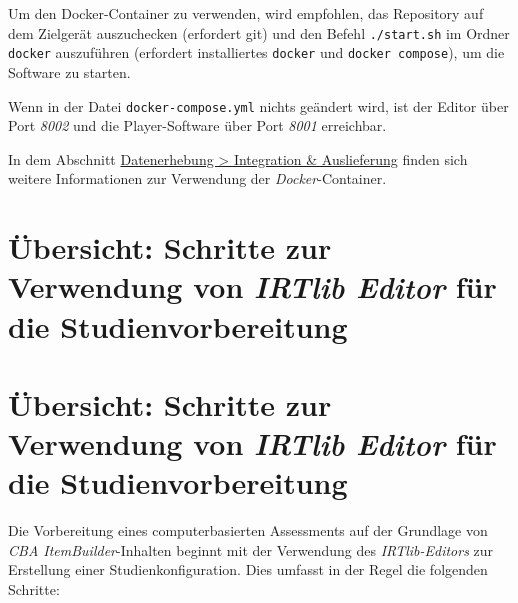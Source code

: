 \documentclass[
  letterpaper,
  DIV=11]{scrreprt}
\begin{document}
Um den Docker-Container zu verwenden, wird empfohlen, das Repository auf
dem Zielgerät auszuchecken (erfordert git) und den Befehl
\texttt{./start.sh} im Ordner \texttt{docker} auszuführen (erfordert
installiertes \texttt{docker} und \texttt{docker\ compose}), um die
Software zu starten.

Wenn in der Datei \texttt{docker-compose.yml} nichts geändert wird, ist
der Editor über Port \emph{8002} und die Player-Software über Port
\emph{8001} erreichbar.

In dem Abschnitt
\href{data-collection-player-integration.qmd}{Datenerhebung
\textgreater{} Integration \& Auslieferung} finden sich weitere
Informationen zur Verwendung der \emph{Docker}-Container.


\hypertarget{uxfcbersicht-schritte-zur-verwendung-von-irtlib-editor-fuxfcr-die-studienvorbereitung}{%
\chapter{\texorpdfstring{Übersicht: Schritte zur Verwendung von
\emph{IRTlib Editor} für die
Studienvorbereitung}{Übersicht: Schritte zur Verwendung von IRTlib Editor für die Studienvorbereitung}}\label{uxfcbersicht-schritte-zur-verwendung-von-irtlib-editor-fuxfcr-die-studienvorbereitung}}

\let\clearpage\standardclearpage


\hypertarget{uxfcbersicht-schritte-zur-verwendung-von-irtlib-editor-fuxfcr-die-studienvorbereitung-1}{%
\chapter{\texorpdfstring{Übersicht: Schritte zur Verwendung von
\emph{IRTlib Editor} für die
Studienvorbereitung}{Übersicht: Schritte zur Verwendung von IRTlib Editor für die Studienvorbereitung}}\label{uxfcbersicht-schritte-zur-verwendung-von-irtlib-editor-fuxfcr-die-studienvorbereitung-1}}

Die Vorbereitung eines computerbasierten Assessments auf der Grundlage
von \emph{CBA ItemBuilder}-Inhalten beginnt mit der Verwendung des
\emph{IRTlib-Editors} zur Erstellung einer Studienkonfiguration. Dies
umfasst in der Regel die folgenden Schritte:
\end{document}
